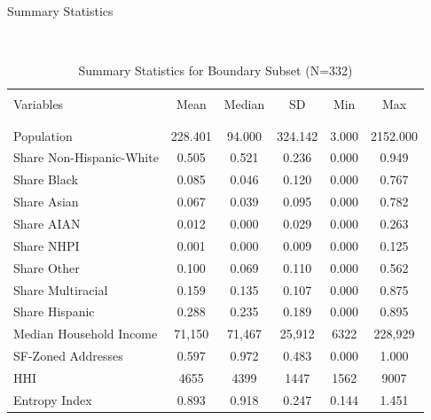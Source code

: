 \documentclass{beamer}
\begin{document}
\begin{frame}{Summary Statistics}

\begin{table}
\footnotesize
\caption{Summary Statistics for Boundary Subset (N=332)}
\\[1.8ex]
\label{tab:causal_summary_stats}
\centering
\begin{tabular}[!htbp]{@{\extracolsep{5pt}}lccccc} 
\hline
\hline
\\[-1.8ex] 
Variables & Mean & Median & SD & Min & Max\\
\\[-1.8ex] \hline\\[-1.8ex] 
Population & 228.401 & 94.000 & 324.142 & 3.000 & 2152.000 \\

Share Non-Hispanic-White & 0.505 & 0.521 & 0.236 & 0.000 & 0.949 \\

Share Black & 0.085 & 0.046 & 0.120 & 0.000 & 0.767 \\

Share Asian & 0.067 & 0.039 & 0.095 & 0.000 & 0.782 \\

Share AIAN & 0.012 & 0.000 & 0.029 & 0.000 & 0.263 \\

Share NHPI & 0.001 & 0.000 & 0.009 & 0.000 & 0.125 \\

Share Other & 0.100 & 0.069 & 0.110 & 0.000 & 0.562 \\

Share Multiracial & 0.159 & 0.135 & 0.107 & 0.000 & 0.875 \\

Share Hispanic & 0.288 & 0.235 & 0.189 & 0.000 & 0.895 \\

Median Household Income & 71,150 & 71,467 & 25,912 & 6322 & 228,929\\

SF-Zoned Addresses & 0.597 & 0.972 & 0.483 & 0.000 & 1.000 \\

HHI & 4655 & 4399 & 1447 & 1562 & 9007 \\
Entropy Index & 0.893 & 0.918 & 0.247 & 0.144 & 1.451 \\
\hline
\hline
\end{tabular}
\end{table}
\end{frame}
\end{document}
